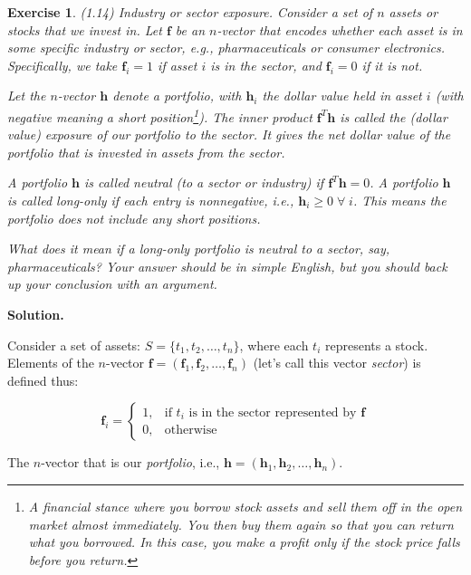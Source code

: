 \documentclass[11pt]{book}
\theoremstyle{definition}
\theoremstyle{plain}
\newtheorem{exercise}{Exercise}[chapter]
\theoremstyle{problemstyle}
\theoremstyle{remark}
\theoremstyle{definition}
\begin{document}
\begin{exercise}
    (1.14) Industry or sector exposure. Consider a set of $n$ assets or stocks that we invest in. Let $\boldsymbol{f}$ be an $n$-vector that encodes whether each asset is in some specific industry or sector, e.g., pharmaceuticals or consumer electronics. Specifically, we take $\boldsymbol{f}_i=1$ if asset $i$ is in the sector, and $\boldsymbol{f}_i=0$ if it is not. 

    Let the $n$-vector $\boldsymbol{h}$ denote a portfolio, with $\boldsymbol{h}_i$ the dollar value held in asset $i$ (with negative meaning a short position\footnote{A financial stance where you \emph{borrow} stock assets and sell them off in the open market almost immediately. You then buy them again so that you can return what you borrowed. In this case, you make a profit only if \emph{the stock price falls before you return}.}). The inner product $\boldsymbol{f}^T\boldsymbol{h}$ is called the (dollar value) exposure of our portfolio to the sector. It gives the net dollar value of the portfolio that is invested in assets from the sector. 

    A portfolio $\boldsymbol{h}$ is called neutral (to a sector or industry) if $\boldsymbol{f}^T\boldsymbol{h}=0$.  A portfolio $\boldsymbol{h}$ is called long-only if each entry is nonnegative, i.e., $\boldsymbol{h}_i\geq 0\;\forall\;i$. This means the portfolio does not include any short positions.

What does it mean if a long-only portfolio is neutral to a sector, say, pharmaceuticals?  Your answer should be in simple English, but you should back up your conclusion with an argument.
\end{exercise}
\textbf{Solution.}

Consider a set of assets: $S=\{t_1, t_2,\dots,t_n\}$, where each $t_i$ represents a stock.
Elements of the $n$-vector $\boldsymbol{f}=(\boldsymbol{f}_1,\boldsymbol{f}_2,\dots,\boldsymbol{f}_n)$ (let's call this vector \emph{sector}) is defined thus:

            \[
                \boldsymbol{f}_i=
               \begin{cases}
                   1,&\text{if $t_i$ is in the sector represented by $\boldsymbol{f}$}\\
                   0,&\text{otherwise}
               \end{cases}
            \]

The $n$-vector that is our \emph{portfolio}, i.e., $\boldsymbol{h}=(\boldsymbol{h}_1,\boldsymbol{h}_2,\dots,\boldsymbol{h}_n)$.
\end{document}
